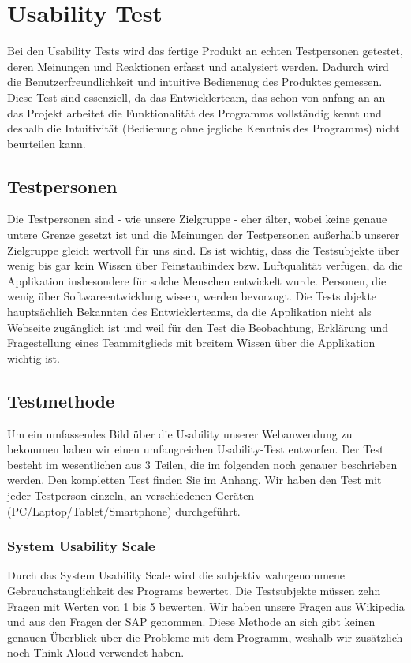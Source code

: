 \section{Usability Test}
Bei den Usability Tests wird das fertige Produkt an echten Testpersonen getestet, deren  Meinungen und Reaktionen erfasst und analysiert werden. Dadurch wird die Benutzerfreundlichkeit und intuitive Bedienenug des Produktes gemessen. Diese Test sind essenziell, da das Entwicklerteam, das schon von anfang an an das Projekt arbeitet die Funktionalität des Programms vollständig kennt und deshalb die Intuitivität (Bedienung ohne jegliche Kenntnis des Programms) nicht beurteilen kann.

  \subsection{Testpersonen}
    Die Testpersonen sind - wie unsere Zielgruppe - eher älter, wobei keine genaue untere Grenze gesetzt ist und die Meinungen der Testpersonen außerhalb unserer Zielgruppe gleich wertvoll für uns sind. Es ist wichtig, dass die Testsubjekte über wenig bis gar kein Wissen über Feinstaubindex bzw. Luftqualität verfügen, da die Applikation insbesondere für solche Menschen entwickelt wurde. Personen, die wenig über Softwareentwicklung wissen, werden bevorzugt. Die Testsubjekte hauptsächlich Bekannten des Entwicklerteams, da die Applikation nicht als Webseite zugänglich ist und weil für den Test die Beobachtung, Erklärung und Fragestellung eines Teammitglieds mit breitem Wissen über die Applikation wichtig ist.

  \subsection{Testmethode}
    Um ein umfassendes Bild über die Usability unserer Webanwendung zu bekommen haben wir einen umfangreichen Usability-Test entworfen. Der Test besteht im wesentlichen aus 3 Teilen, die im folgenden noch genauer beschrieben werden. Den kompletten Test finden Sie im Anhang.
    Wir haben den Test mit jeder Testperson einzeln, an verschiedenen Geräten (PC/Laptop/Tablet/Smartphone) durchgeführt.

    \subsubsection*{System Usability Scale}
      Durch das System Usability Scale wird die subjektiv wahrgenommene Gebrauchstauglichkeit des Programs bewertet. Die Testsubjekte müssen zehn Fragen mit Werten von 1 bis 5 bewerten. Wir haben unsere Fragen aus Wikipedia und aus den Fragen der SAP genommen. Diese Methode an sich gibt keinen genauen Überblick über die Probleme mit dem Programm, weshalb wir zusätzlich noch Think Aloud verwendet haben.
      
